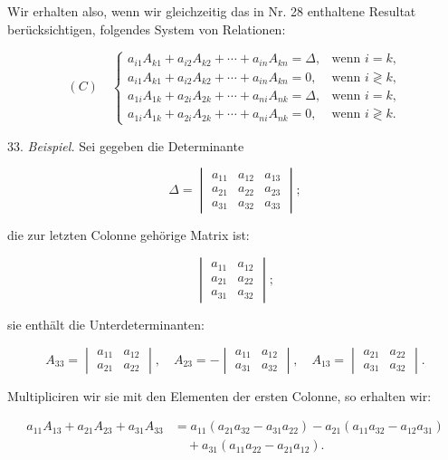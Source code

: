 Wir erhalten also, wenn wir gleichzeitig das in Nr. 28 enthaltene
Resultat berücksichtigen, folgendes System von Relationen:

\[
(C)\quad
\begin{cases}
a_{i1}A_{k1}+a_{i2}A_{k2}+\cdots+a_{in}A_{kn}=\Delta, & \text{wenn } i=k,\\
a_{i1}A_{k1}+a_{i2}A_{k2}+\cdots+a_{in}A_{kn}=0, & \text{wenn } i\gtrless k,\\
a_{1i}A_{1k}+a_{2i}A_{2k}+\cdots+a_{ni}A_{nk}=\Delta, & \text{wenn } i=k,\\
a_{1i}A_{1k}+a_{2i}A_{2k}+\cdots+a_{ni}A_{nk}=0, & \text{wenn } i\gtrless k.
\end{cases}
\]

33. \textit{Beispiel.} Sei gegeben die Determinante

\[
\Delta=
\begin{vmatrix}
a_{11} & a_{12} & a_{13} \\
a_{21} & a_{22} & a_{23} \\
a_{31} & a_{32} & a_{33}
\end{vmatrix};
\]

die zur letzten Colonne gehörige Matrix ist:

\[
\begin{vmatrix}
a_{11} & a_{12} \\
a_{21} & a_{22} \\
a_{31} & a_{32}
\end{vmatrix};
\]

sie enthält die Unterdeterminanten:

\[
A_{33}=\begin{vmatrix} a_{11} & a_{12} \\ a_{21} & a_{22} \end{vmatrix},\quad
A_{23}=-\begin{vmatrix} a_{11} & a_{12} \\ a_{31} & a_{32} \end{vmatrix},\quad
A_{13}=\begin{vmatrix} a_{21} & a_{22} \\ a_{31} & a_{32} \end{vmatrix}.
\]

Multipliciren wir sie mit den Elementen der ersten Colonne, so erhalten
wir:

\[
\begin{aligned}
a_{11}A_{13}+a_{21}A_{23}+a_{31}A_{33} &= a_{11}(a_{21}a_{32}-a_{31}a_{22})-a_{21}(a_{11}a_{32}-a_{12}a_{31})\\
&\quad{}+a_{31}(a_{11}a_{22}-a_{21}a_{12}).
\end{aligned}
\]

